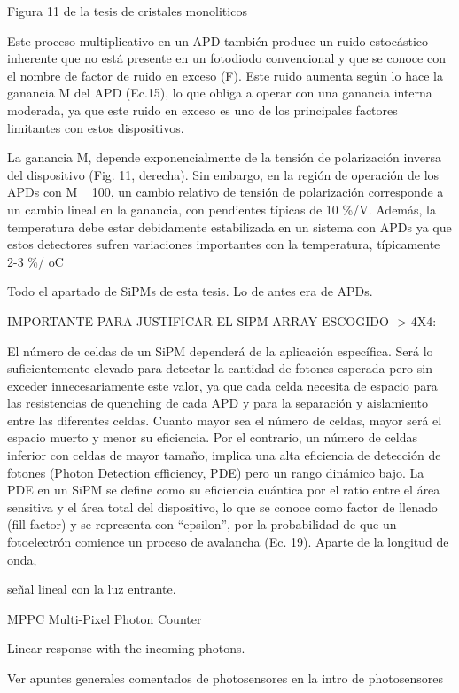 Figura 11 de la tesis de cristales monoliticos

Este proceso multiplicativo en un APD también produce un ruido estocástico inherente que no está presente en un fotodiodo convencional y que se conoce con el nombre de factor de ruido en exceso (F). Este ruido aumenta según lo hace la ganancia M del APD (Ec.15), lo que obliga a operar con una ganancia interna moderada, ya que este ruido en exceso es uno de los principales factores limitantes con estos dispositivos.

La ganancia M, depende exponencialmente de la tensión de polarización inversa del dispositivo (Fig. 11, derecha). Sin embargo, en la región de operación de los APDs con M ~ 100, un cambio relativo de tensión de polarización corresponde a un cambio lineal en la ganancia, con pendientes típicas de 10 \%/V. Además, la temperatura debe estar debidamente estabilizada en un sistema con APDs ya que estos detectores sufren variaciones importantes con la temperatura, típicamente ~ 2-3 \%/ oC

Todo el apartado de SiPMs de esta tesis. Lo de antes era de APDs.

IMPORTANTE PARA JUSTIFICAR EL SIPM ARRAY ESCOGIDO -> 4X4:

El número de celdas de un SiPM dependerá de la aplicación específica. Será lo suficientemente elevado para detectar la cantidad de fotones esperada pero sin exceder innecesariamente este valor, ya que cada celda necesita de espacio para las resistencias de quenching de cada APD y para la separación y aislamiento entre las diferentes celdas. Cuanto mayor sea el número de celdas, mayor será el espacio muerto y menor su eficiencia. Por el contrario, un número de celdas inferior con celdas de mayor tamaño, implica una alta eficiencia de detección de fotones (Photon Detection efficiency, PDE) pero un rango dinámico bajo. La PDE en un SiPM se define como su eficiencia cuántica por el ratio entre el área sensitiva y el área total del dispositivo, lo que se conoce como factor de llenado (fill factor) y se representa con “epsilon”, por la probabilidad de que un fotoelectrón comience un proceso de avalancha (Ec. 19). Aparte de la longitud de onda, 


señal lineal con la luz entrante.

MPPC Multi-Pixel Photon Counter

Linear response with the incoming photons.

Ver apuntes generales comentados de photosensores en la intro de photosensores

